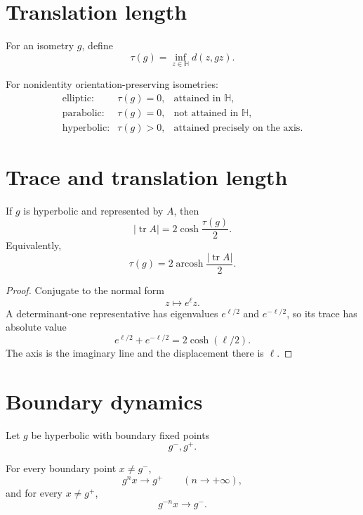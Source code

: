 \section{Translation length}

\begin{definition}\label{def:vii34-translation-length}
For an isometry \(g\), define
\[
\tau(g)
=
\inf_{z\in\mathbb H}d(z,gz).
\]
\end{definition}

\begin{theorem}\label{thm:vii34-tau-cases}
For nonidentity orientation-preserving isometries:
\[
\begin{array}{lll}
\text{elliptic:} & \tau(g)=0, & \text{attained in }\mathbb H,\\
\text{parabolic:} & \tau(g)=0, & \text{not attained in }\mathbb H,\\
\text{hyperbolic:} & \tau(g)>0, & \text{attained precisely on the axis}.
\end{array}
\]
\end{theorem}

\section{Trace and translation length}

\begin{theorem}\label{thm:vii34-trace-length}
If \(g\) is hyperbolic and represented by \(A\), then
\[
|\operatorname{tr}A|
=
2\cosh\frac{\tau(g)}2.
\]
Equivalently,
\[
\tau(g)
=
2\operatorname{arcosh}\frac{|\operatorname{tr}A|}{2}.
\]
\end{theorem}

\begin{proof}
Conjugate to the normal form
\[
z\mapsto e^\ell z.
\]
A determinant-one representative has eigenvalues \(e^{\ell/2}\) and
\(e^{-\ell/2}\), so its trace has absolute value
\[
e^{\ell/2}+e^{-\ell/2}
=
2\cosh(\ell/2).
\]
The axis is the imaginary line and the displacement there is \(\ell\).
\end{proof}

\section{Boundary dynamics}

Let \(g\) be hyperbolic with boundary fixed points
\[
g^-,g^+.
\]

\begin{proposition}\label{prop:vii34-north-south}
For every boundary point \(x\ne g^-\),
\[
g^n x\to g^+
\qquad(n\to+\infty),
\]
and for every \(x\ne g^+\),
\[
g^{-n}x\to g^-.
\]
\end{proposition}

